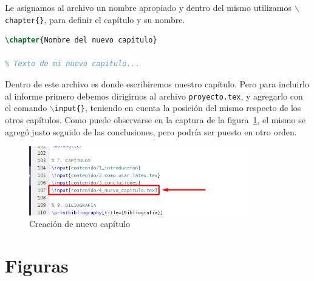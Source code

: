 Le asignamos al archivo un nombre apropiado y dentro del mismo utilizamos  \texttt{$\backslash$chapter\{\}}, para definir el capítulo y su nombre.

\footnotesize
\begin{lstlisting}[language=TeX, numbers=none]
\chapter{Nombre del nuevo capitulo}

% Texto de mi nuevo capitulo...
\end{lstlisting}
\normalsize

Dentro de este archivo es donde escribiremos nuestro capítulo. Pero para incluirlo al informe primero debemos dirigirnos al archivo \texttt{proyecto.tex}, y agregarlo con el comando \texttt{$\backslash$input\{\}}, teniendo en cuenta la posición del mismo respecto de los otros capítulos. Como puede observarse en la captura de la figura~\ref{F:nuevo_capitulo}, el mismo se agregó justo seguido de las conclusiones, pero podría ser puesto en otro orden.
\clearpage
\begin{figure}[ht]
  \centering
  \includegraphics[width=0.85\textwidth]{./imagenes/nuevo_capitulo.png}
  \caption{Creación de nuevo capítulo}
  \label{F:nuevo_capitulo}
\end{figure}

\clearpage
\section{Figuras}

